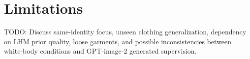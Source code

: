 \section{Limitations}

TODO: Discuss same-identity focus, unseen clothing generalization, dependency on LHM prior quality, loose garments, and possible inconsistencies between white-body conditions and GPT-image-2 generated supervision.
